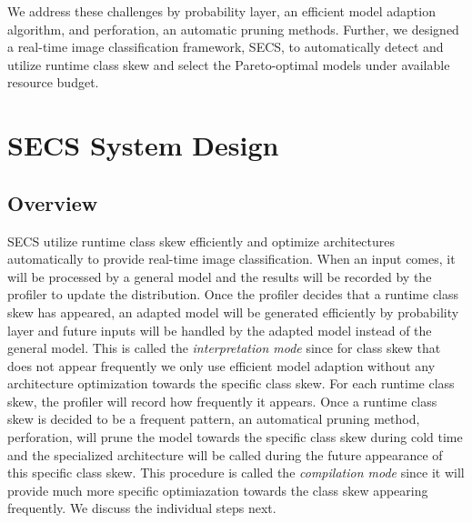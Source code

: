 \documentclass[pageno]{jpaper}
\begin{document}
We address these challenges by probability layer, an efficient model adaption algorithm, and perforation, an automatic pruning methods. Further, we designed a real-time image classification framework, SECS, to automatically detect and utilize runtime class skew and select the Pareto-optimal models under available resource budget.
























\section{SECS System Design} \label{SECS}
\subsection{Overview}
SECS utilize runtime class skew efficiently and optimize architectures automatically to provide real-time image classification. When an input comes, it will be processed by a general model and the results will be recorded by the profiler to update the distribution. Once the profiler decides that a runtime class skew has appeared, an adapted model will be generated efficiently by probability layer and future inputs will be handled by the adapted model instead of the general model. This is called the \textit{interpretation mode} since for class skew that does not appear frequently we only use efficient model adaption without any architecture optimization towards the specific class skew. For each runtime class skew, the profiler will record how frequently it appears. Once a runtime class skew is decided to be a frequent pattern, an automatical pruning method, perforation, will prune the model towards the specific class skew during cold time and the specialized architecture will be called during the future appearance of this specific class skew. This procedure is called the \textit{compilation mode} since it will provide much more specific optimiazation towards the class skew appearing frequently. We discuss the individual steps next.
\end{document}
